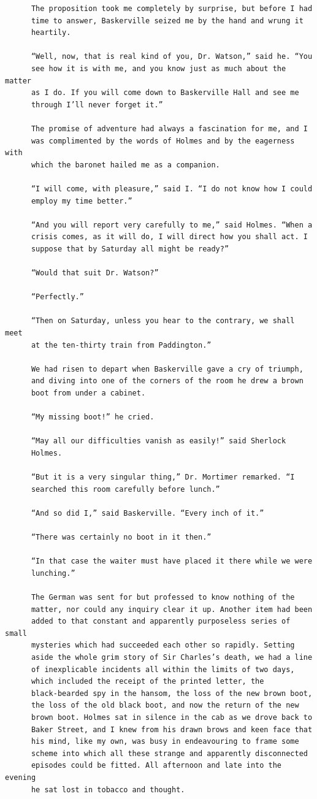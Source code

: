 \documentclass{article}
\begin{document}
\begin{verbatim}
      The proposition took me completely by surprise, but before I had
      time to answer, Baskerville seized me by the hand and wrung it
      heartily.

      “Well, now, that is real kind of you, Dr. Watson,” said he. “You
      see how it is with me, and you know just as much about the matter
      as I do. If you will come down to Baskerville Hall and see me
      through I’ll never forget it.”

      The promise of adventure had always a fascination for me, and I
      was complimented by the words of Holmes and by the eagerness with
      which the baronet hailed me as a companion.

      “I will come, with pleasure,” said I. “I do not know how I could
      employ my time better.”

      “And you will report very carefully to me,” said Holmes. “When a
      crisis comes, as it will do, I will direct how you shall act. I
      suppose that by Saturday all might be ready?”

      “Would that suit Dr. Watson?”

      “Perfectly.”

      “Then on Saturday, unless you hear to the contrary, we shall meet
      at the ten-thirty train from Paddington.”

      We had risen to depart when Baskerville gave a cry of triumph,
      and diving into one of the corners of the room he drew a brown
      boot from under a cabinet.

      “My missing boot!” he cried.

      “May all our difficulties vanish as easily!” said Sherlock
      Holmes.

      “But it is a very singular thing,” Dr. Mortimer remarked. “I
      searched this room carefully before lunch.”

      “And so did I,” said Baskerville. “Every inch of it.”

      “There was certainly no boot in it then.”

      “In that case the waiter must have placed it there while we were
      lunching.”

      The German was sent for but professed to know nothing of the
      matter, nor could any inquiry clear it up. Another item had been
      added to that constant and apparently purposeless series of small
      mysteries which had succeeded each other so rapidly. Setting
      aside the whole grim story of Sir Charles’s death, we had a line
      of inexplicable incidents all within the limits of two days,
      which included the receipt of the printed letter, the
      black-bearded spy in the hansom, the loss of the new brown boot,
      the loss of the old black boot, and now the return of the new
      brown boot. Holmes sat in silence in the cab as we drove back to
      Baker Street, and I knew from his drawn brows and keen face that
      his mind, like my own, was busy in endeavouring to frame some
      scheme into which all these strange and apparently disconnected
      episodes could be fitted. All afternoon and late into the evening
      he sat lost in tobacco and thought.


\end{verbatim}
\end{document}
